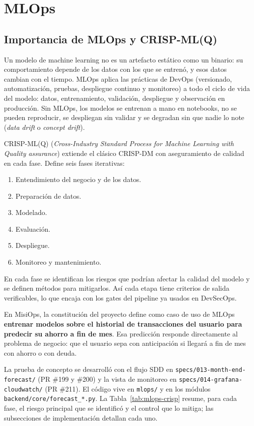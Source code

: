 \section{MLOps}

\subsection{Importancia de MLOps y CRISP-ML(Q)}

Un modelo de machine learning no es un artefacto estático como un binario: su comportamiento depende de los datos con los que se entrenó, y esos datos cambian con el tiempo. MLOps aplica las prácticas de DevOps (versionado, automatización, pruebas, despliegue continuo y monitoreo) a todo el ciclo de vida del modelo: datos, entrenamiento, validación, despliegue y observación en producción. Sin MLOps, los modelos se entrenan a mano en notebooks, no se pueden reproducir, se despliegan sin validar y se degradan sin que nadie lo note (\textit{data drift} o \textit{concept drift}).

CRISP-ML(Q) (\textit{Cross-Industry Standard Process for Machine Learning with Quality assurance}) extiende el clásico CRISP-DM con aseguramiento de calidad en cada fase. Define seis fases iterativas:
\begin{enumerate}
    \item Entendimiento del negocio y de los datos.
    \item Preparación de datos.
    \item Modelado.
    \item Evaluación.
    \item Despliegue.
    \item Monitoreo y mantenimiento.
\end{enumerate}
En cada fase se identifican los riesgos que podrían afectar la calidad del modelo y se definen métodos para mitigarlos. Así cada etapa tiene criterios de salida verificables, lo que encaja con los gates del pipeline ya usados en DevSecOps.

En MisiOps, la constitución del proyecto define como caso de uso de MLOps \textbf{entrenar modelos sobre el historial de transacciones del usuario para predecir su ahorro a fin de mes}. Esa predicción responde directamente al problema de negocio: que el usuario sepa con anticipación si llegará a fin de mes con ahorro o con deuda.

La prueba de concepto se desarrolló con el flujo SDD en \texttt{specs/013-month-end-forecast/} (PR \#199 y \#200) y la vista de monitoreo en \texttt{specs/014-grafana-cloudwatch/} (PR \#211). El código vive en \texttt{mlops/} y en los módulos \texttt{backend/core/forecast\_*.py}. La Tabla~\ref{tab:mlops-crisp} resume, para cada fase, el riesgo principal que se identificó y el control que lo mitiga; las subsecciones de implementación detallan cada uno.

